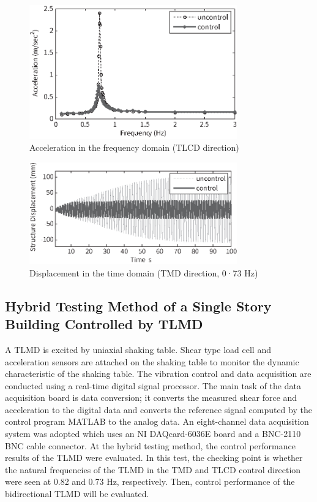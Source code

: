 \begin{figure}[ht]
\centering
\includegraphics[width=0.8\textwidth] {figure/5-10.eps}
\caption{Acceleration in the frequency domain (TLCD direction)}
\label{fig:5-10}
\end{figure}

\begin{figure}[ht]
\centering
\includegraphics[width=0.8\textwidth] {figure/5-11.eps}
\caption{Displacement in the time domain (TMD direction, 0·73 Hz)}
\label{fig:5-11}
\end{figure}

\subsection{Hybrid Testing Method of a Single Story Building Controlled by TLMD}

A TLMD is excited by uniaxial shaking table. Shear type load cell and acceleration sensors are attached on the shaking table to monitor the dynamic characteristic of the shaking table. The vibration control and data acquisition are conducted using a real-time digital signal processor. The main task of the data acquisition board is data conversion; it converts the measured shear force and acceleration to the digital data and converts the reference signal computed by the control program MATLAB to the analog data. An eight-channel data acquisition system was adopted which uses an NI DAQcard-6036E board and a BNC-2110 BNC cable connector. At the hybrid testing method, the control performance results of the TLMD were evaluated. In this test, the checking point is whether the natural frequencies of the TLMD in the TMD and TLCD control direction were seen at 0.82 and 0.73 Hz, respectively. Then, control performance of the bidirectional TLMD will be evaluated.

